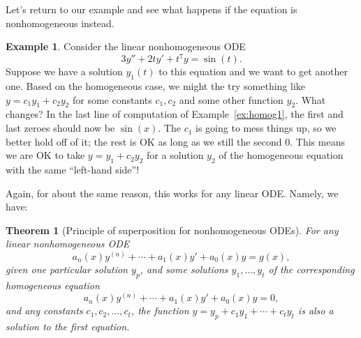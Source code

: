 \documentclass[12pt]{amsart}
\numberwithin{equation}{section}
\theoremstyle{plain} %
\newtheorem{thm}[equation]{Theorem}
\theoremstyle{definition}
\newtheorem{ex}[equation]{Example}
\theoremstyle{remark}
\begin{document}
Let's return to our example and see what happens if the equation is nonhomogeneous instead.
\begin{ex} Consider the linear nonhomogeneous ODE
\[ 3y'' + 2ty' + t^7 y = \sin(t).\]
Suppose we have a solution $y_1(t)$ to this equation and we want to get another one. Based on the homogeneous case, we might the try something like $y=c_1 y_1 + c_2 y_2$ for some constants $c_1,c_2$ and some other function $y_2$. What changes? In the last line of computation of Example~\ref{ex:homog1}, the first and last zeroes should now be $\sin(x)$. The $c_1$ is going to mess things up, so we better hold off of it; the rest is OK as long as we still the second $0$. This means we are OK to take $y= y_1 + c_2 y_2$ for a solution $y_2$ of the homogeneous equation with the same ``left-hand side''!
\end{ex}

Again, for about the same reason, this works for any linear ODE.  Namely, we have:

\begin{thm}[Principle of superposition for nonhomogeneous ODEs] 
For any linear nonhomogeneous ODE
\[ a_n(x) y^{(n)} +  \cdots + a_1(x) y' +  a_0(x) y = g(x),\]
given one particular solution $y_p$, and some solutions $y_1, \dots,y_t$ of the corresponding homogeneous equation
\[ a_n(x) y^{(n)} +  \cdots + a_1(x) y' +  a_0(x) y = 0,\]
and any constants $c_1,c_2, \dots,c_t$, the function
$y = y_p + c_1 y_1 + \cdots + c_t y_t$ is also a solution to the first equation.
\end{thm}
\end{document}
